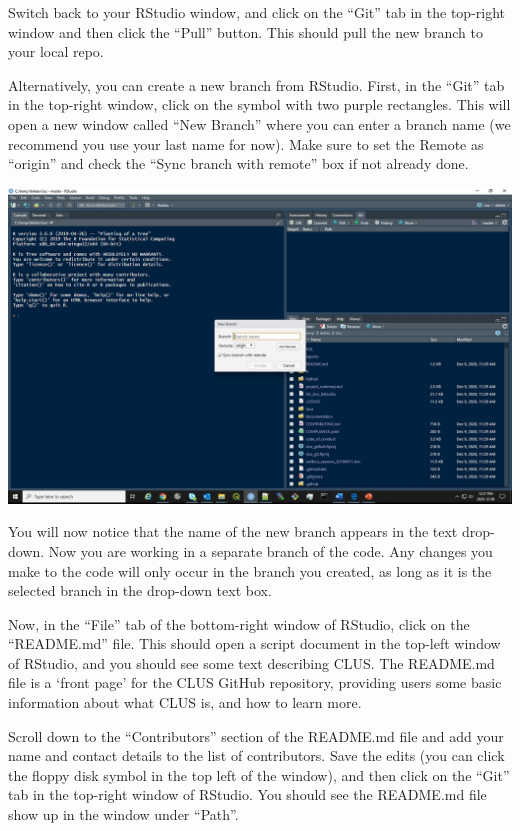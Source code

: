 \documentclass[
]{article}
\begin{document}
Switch back to your RStudio window, and click on the ``Git'' tab in the
top-right window and then click the ``Pull'' button. This should pull
the new branch to your local repo.

Alternatively, you can create a new branch from RStudio. First, in the
``Git'' tab in the top-right window, click on the symbol with two purple
rectangles. This will open a new window called ``New Branch'' where you
can enter a branch name (we recommend you use your last name for now).
Make sure to set the Remote as ``origin'' and check the ``Sync branch
with remote'' box if not already done.

\includegraphics{images/git_branch2.jpg}

You will now notice that the name of the new branch appears in the text
drop-down. Now you are working in a separate branch of the code. Any
changes you make to the code will only occur in the branch you created,
as long as it is the selected branch in the drop-down text box.

Now, in the ``File'' tab of the bottom-right window of RStudio, click on
the ``README.md'' file. This should open a script document in the
top-left window of RStudio, and you should see some text describing
CLUS. The README.md file is a `front page' for the CLUS GitHub
repository, providing users some basic information about what CLUS is,
and how to learn more.

Scroll down to the ``Contributors'' section of the README.md file and
add your name and contact details to the list of contributors. Save the
edits (you can click the floppy disk symbol in the top left of the
window), and then click on the ``Git'' tab in the top-right window of
RStudio. You should see the README.md file show up in the window under
``Path''.
\end{document}
